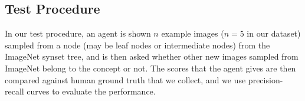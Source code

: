 \subsection{Test Procedure}

In our test procedure, an agent is shown $n$ example images ($n=5$ in our dataset) sampled from a node (may be leaf nodes or intermediate nodes) from the ImageNet synset tree, and is then asked whether other new images sampled from ImageNet belong to the concept or not. The scores that the agent gives are then compared against human ground truth that we collect, and we use precision-recall curves to evaluate the performance.

\begin{figure}
  \centering

\end{figure}

